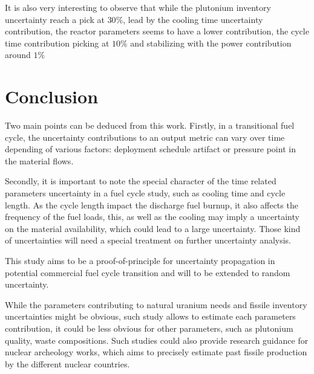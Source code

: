 \documentclass{anstrans}
\begin{document}
It is also very interesting to observe that while the plutonium inventory uncertainty
reach a pick at $30\%$, lead by the cooling time uncertainty contribution, the reactor
parameters seems to have a lower contribution, the cycle time contribution
picking at $10\%$ and stabilizing with the power contribution around $1\%$


\section{Conclusion}

Two main points can be deduced from this work. Firstly, in a transitional
fuel cycle, the uncertainty contributions to an output metric can vary over time
depending of various factors: deployment schedule artifact or pressure point in
the material flows.

Secondly, it is important to note the special character of the time related
parameters uncertainty in a fuel cycle study, such as cooling time and cycle
length. As the cycle length impact the discharge fuel burnup, it also affects
the frequency of the fuel loads, this, as well as the cooling may imply a
uncertainty on the material availability, which could lead to a large
uncertainty. Those kind of uncertainties will need a special treatment on further
uncertainty analysis.

This study aims to be a proof-of-principle for uncertainty propagation in
potential commercial fuel cycle transition and will to be extended to random
uncertainty.

While the parameters contributing to natural uranium needs and fissile inventory
uncertainties might be obvious, such study allows to estimate each parameters
contribution, it could be less obvious for other parameters, such as
plutonium quality, waste compositions. Such studies could also provide research
guidance for nuclear archeology works, which aims to precisely estimate past
fissile production by the different nuclear countries.
\end{document}
